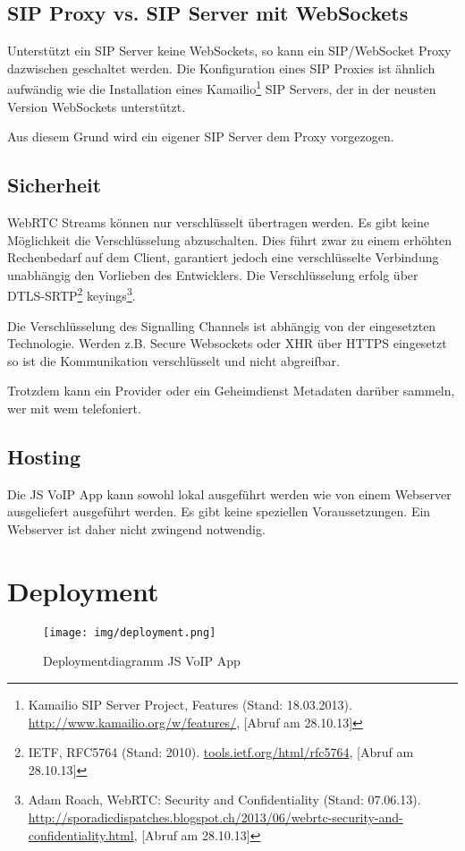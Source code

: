 	\subsection{SIP Proxy vs. SIP Server mit WebSockets}
		Unterstützt ein SIP Server keine WebSockets, so kann ein SIP/WebSocket Proxy dazwischen geschaltet werden. Die Konfiguration eines SIP Proxies ist ähnlich aufwändig wie die Installation eines Kamailio\footnote{Kamailio SIP Server Project, Features (Stand: 18.03.2013). \hyperlink{http://www.kamailio.org/w/features/}{http://www.kamailio.org/w/features/}, [Abruf am 28.10.13]} SIP Servers, der in der neusten Version WebSockets unterstützt.

		Aus diesem Grund wird ein eigener SIP Server dem Proxy vorgezogen.

	\subsection{Sicherheit}
		WebRTC Streams können nur verschlüsselt übertragen werden. Es gibt keine Möglichkeit die Verschlüsselung abzuschalten. Dies führt zwar zu einem erhöhten Rechenbedarf auf dem Client, garantiert jedoch eine verschlüsselte Verbindung unabhängig den Vorlieben des Entwicklers.
		Die Verschlüsselung erfolg über DTLS-SRTP\footnote{IETF, RFC5764 (Stand: 2010). \hyperlink{http://tools.ietf.org/html/rfc5764}{tools.ietf.org/html/rfc5764}, [Abruf am 28.10.13]} keyings\footnote{Adam Roach, WebRTC: Security and Confidentiality (Stand: 07.06.13). \hyperlink{http://sporadicdispatches.blogspot.ch/2013/06/webrtc-security-and-confidentiality.html}{http://sporadicdispatches.blogspot.ch/2013/06/webrtc-security-and-confidentiality.html}, [Abruf am 28.10.13]}. 
		
		Die Verschlüsselung des Signalling Channels ist abhängig von der eingesetzten Technologie. Werden z.B. Secure Websockets oder XHR über HTTPS eingesetzt so ist die Kommunikation verschlüsselt und nicht abgreifbar.
		
		Trotzdem kann ein Provider oder ein Geheimdienst Metadaten darüber sammeln, wer mit wem telefoniert.
		  
	\subsection{Hosting}
		Die JS VoIP App kann sowohl lokal ausgeführt werden wie von einem Webserver ausgeliefert ausgeführt werden. Es gibt keine speziellen Voraussetzungen. Ein Webserver ist daher nicht zwingend notwendig.
	
	
\section{Deployment}
	\begin{figure}[h]
		\centering
		\texttt{[image: img/deployment.png]}
		\label{img:deployment}
		\caption{Deploymentdiagramm JS VoIP App}
	\end{figure}